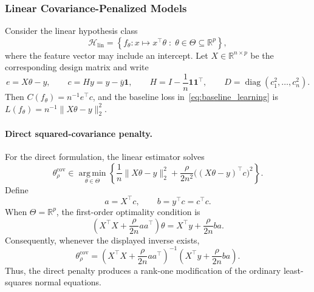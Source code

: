 \documentclass[10pt]{article}
\theoremstyle{definition}
\newcommand{\diag}{\operatorname{diag}}
\newcommand{\1}{\mathbf{1}}
\newcommand{\argminop}{\operatorname*{arg\,min}}
\begin{document}
{{{\subsubsection{Linear Covariance-Penalized Models}
\label{subsubsec:linear_covariance_models}

Consider the linear hypothesis class
\[
\mathcal H_{\mathrm{lin}}
=
\left\{
f_\theta:x\mapsto x^\top\theta
\;:\;
\theta\in\Theta\subseteq\mathbb R^p
\right\},
\]
where the feature vector may include an intercept. Let \(X\in\mathbb R^{n\times p}\) be the corresponding design matrix and write
\[
e=X\theta-y,
\qquad
c=Hy=y-\bar y\mathbf 1,
\qquad
H=I-\frac{1}{n}\mathbf 1\mathbf 1^\top,
\qquad
D=\diag(c_1^2,\ldots,c_n^2).
\]
Then \(C(f_\theta)=n^{-1}e^\top c\), and the baseline loss in~\eqref{eq:baseline_learning} is \(L(f_\theta)=n^{-1}\lVert X\theta-y\rVert_2^2\).

\paragraph{Direct squared-covariance penalty.}
For the direct formulation, the linear estimator solves
\begin{equation}
\label{eq:linear_direct_problem}
\theta_\rho^{\mathrm{cov}}
\in
\argminop_{\theta\in\Theta}
\left\{
\frac{1}{n}\lVert X\theta-y\rVert_2^2
+
\frac{\rho}{2n^2}
\bigl((X\theta-y)^\top c\bigr)^2
\right\}.
\end{equation}
Define
\[
a=X^\top c,
\qquad
b=y^\top c=c^\top c.
\]
When \(\Theta=\mathbb R^p\), the first-order optimality condition is
\begin{equation}
\label{eq:linear_direct_normal_equations}
\left(
X^\top X+\frac{\rho}{2n}aa^\top
\right)\theta
=
X^\top y+\frac{\rho}{2n}ba.
\end{equation}
Consequently, whenever the displayed inverse exists,
\begin{equation}
\label{eq:linear_direct_closed_form}
\theta_\rho^{\mathrm{cov}}
=
\left(
X^\top X+\frac{\rho}{2n}aa^\top
\right)^{-1}
\left(
X^\top y+\frac{\rho}{2n}ba
\right).
\end{equation}
Thus, the direct penalty produces a rank-one modification of the ordinary least-squares normal equations.

}}}
\end{document}
